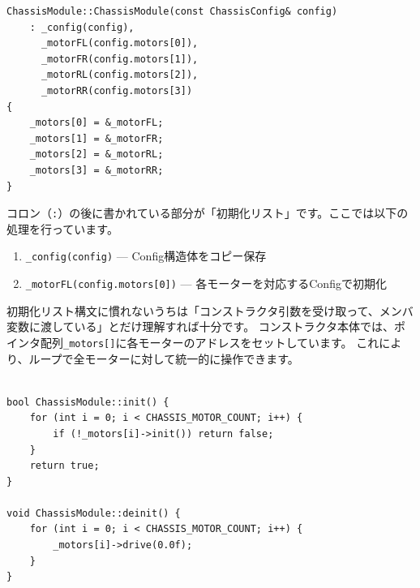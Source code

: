 \begin{lstlisting}[style=cppstyle, caption={ChassisModule.cpp — init()/deinit()で内部モジュールを管理}]
ChassisModule::ChassisModule(const ChassisConfig& config)
    : _config(config),
      _motorFL(config.motors[0]),
      _motorFR(config.motors[1]),
      _motorRL(config.motors[2]),
      _motorRR(config.motors[3])
{
    _motors[0] = &_motorFL;
    _motors[1] = &_motorFR;
    _motors[2] = &_motorRL;
    _motors[3] = &_motorRR;
}
\end{lstlisting}

\begin{notebox}
コロン（\texttt{:}）の後に書かれている部分が「初期化リスト」です。ここでは以下の処理を行っています。

\begin{enumerate}
    \item \texttt{\_config(config)} — Config構造体をコピー保存
    \item \texttt{\_motorFL(config.motors[0])} — 各モーターを対応するConfigで初期化
\end{enumerate}

初期化リスト構文に慣れないうちは「コンストラクタ引数を受け取って、メンバ変数に渡している」とだけ理解すれば十分です。
コンストラクタ本体では、ポインタ配列\texttt{\_motors[]}に各モーターのアドレスをセットしています。
これにより、ループで全モーターに対して統一的に操作できます。
\end{notebox}

\begin{lstlisting}[style=cppstyle, caption={ChassisModule.cpp — init()/deinit()（続き）}]

bool ChassisModule::init() {
    for (int i = 0; i < CHASSIS_MOTOR_COUNT; i++) {
        if (!_motors[i]->init()) return false;
    }
    return true;
}

void ChassisModule::deinit() {
    for (int i = 0; i < CHASSIS_MOTOR_COUNT; i++) {
        _motors[i]->drive(0.0f);
    }
}
\end{lstlisting}


